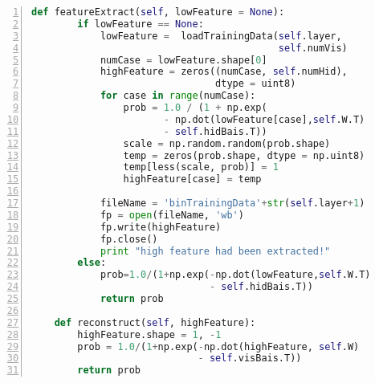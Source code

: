 \begin{lstlisting}[language=Python,numbers=left, frame=shadowbox, rulesepcolor=\color{cadegrey}, caption=\text{RBM.py}]
    def featureExtract(self, lowFeature = None):
        if lowFeature == None:
            lowFeature =  loadTrainingData(self.layer, 
                                           self.numVis)    
            numCase = lowFeature.shape[0]
            highFeature = zeros((numCase, self.numHid), 
                                dtype = uint8)
            for case in range(numCase):
                prob = 1.0 / (1 + np.exp( 
                       - np.dot(lowFeature[case],self.W.T)
                       - self.hidBais.T))
                scale = np.random.random(prob.shape) 
                temp = zeros(prob.shape, dtype = np.uint8)
                temp[less(scale, prob)] = 1
                highFeature[case] = temp
            
            fileName = 'binTrainingData'+str(self.layer+1)
            fp = open(fileName, 'wb')
            fp.write(highFeature)
            fp.close()
            print "high feature had been extracted!"
        else:
            prob=1.0/(1+np.exp(-np.dot(lowFeature,self.W.T)
                               - self.hidBais.T))
            return prob
    
    def reconstruct(self, highFeature):
        highFeature.shape = 1, -1
        prob = 1.0/(1+np.exp(-np.dot(highFeature, self.W)
                             - self.visBais.T))
        return prob
\end{lstlisting}




\newpage




